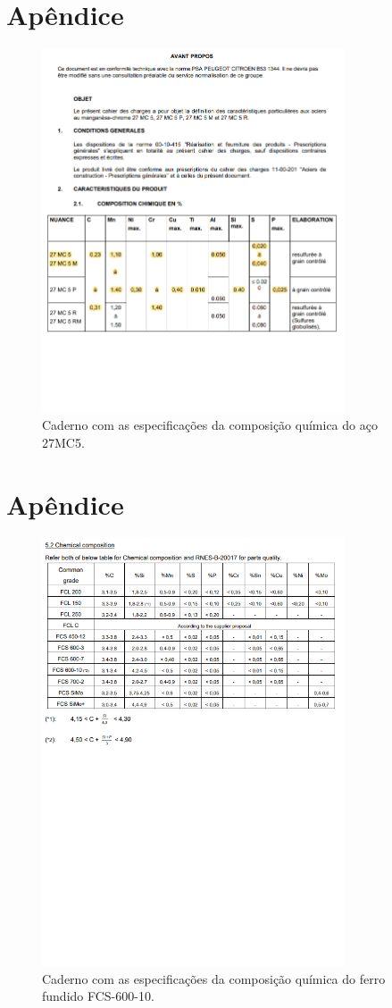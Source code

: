 \chapter{Apêndice} \label{ap:ap2}
\begin{figure}[htpb]
    \centering
    \includegraphics[width=0.8\textwidth]{Figures/Apendix/Chemical_Comp_Coroa.png}
    \caption{Caderno com as especificações da composição química do aço 27MC5.}
    \label{fig:chemical_comp_coroa}
\end{figure}
\newpage
\chapter{Apêndice} \label{ap:ap3}
\begin{figure}[htpb]
    \centering
    \includegraphics[width=0.8\textwidth]{Figures/Apendix/Chemical_Comp_Caixa.png}
    \caption{Caderno com as especificações da composição química do ferro fundido FCS-600-10.}
    \label{fig:chemical_comp_caixa}
\end{figure}